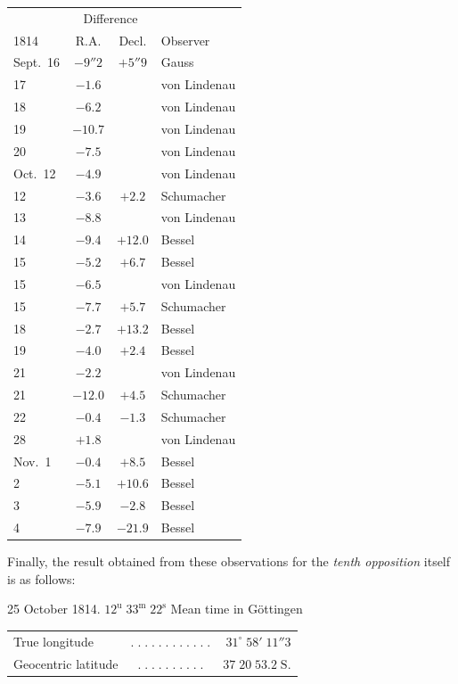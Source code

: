 \begin{center}
\fontsize{10}{12}\selectfont\setlength{\tabcolsep}{5pt}\renewcommand{\arraystretch}{1.15}\begin{tabular}{l|cc|l}
 & \multicolumn{2}{c|}{Difference} & \\
1814 & R.A. & Decl. & Observer \\
\hline
Sept.\ 16 & $-9''2$ & $+5''9$ & Gauss \\
17 & $-1.6$ & & von Lindenau \\
18 & $-6.2$ & & von Lindenau \\
19 & $-10.7$ & & von Lindenau \\
20 & $-7.5$ & & von Lindenau \\
Oct.\ 12 & $-4.9$ & & von Lindenau \\
12 & $-3.6$ & $+2.2$ & Schumacher \\
13 & $-8.8$ & & von Lindenau \\
14 & $-9.4$ & $+12.0$ & Bessel \\
15 & $-5.2$ & $+6.7$ & Bessel \\
15 & $-6.5$ & & von Lindenau \\
15 & $-7.7$ & $+5.7$ & Schumacher \\
18 & $-2.7$ & $+13.2$ & Bessel \\
19 & $-4.0$ & $+2.4$ & Bessel \\
21 & $-2.2$ & & von Lindenau \\
21 & $-12.0$ & $+4.5$ & Schumacher \\
22 & $-0.4$ & $-1.3$ & Schumacher \\
28 & $+1.8$ & & von Lindenau \\
Nov.\ 1 & $-0.4$ & $+8.5$ & Bessel \\
2 & $-5.1$ & $+10.6$ & Bessel \\
3 & $-5.9$ & $-2.8$ & Bessel \\
4 & $-7.9$ & $-21.9$ & Bessel \\
\end{tabular}
\end{center}

\par\indent Finally, the result obtained from these observations for the \emph{tenth opposition} itself is as follows:

\begin{center}25 October 1814. $12^{\mathrm u}\;33^{\mathrm m}\;22^{\mathrm s}$ Mean time in Göttingen\end{center}
\begin{center}\fontsize{10}{12}\selectfont\setlength{\tabcolsep}{3pt}\renewcommand{\arraystretch}{1.15}\begin{tabular}{lcr}
True longitude & $.\;.\;.\;.\;.\;.\;.\;.\;.\;.\;.\;.$ & $31^\circ\;58'\;11''3$\\
Geocentric latitude & $.\;.\;.\;.\;.\;.\;.\;.\;.\;.$ & $37\;20\;53.2\;\mathrm{S.}$\\
\end{tabular}\end{center}

